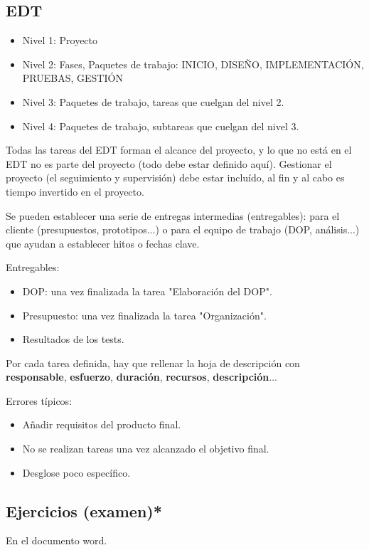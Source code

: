 \documentclass{article}
\begin{document}
\subsection{EDT}
\begin{itemize}
	\item Nivel 1: Proyecto
	\item Nivel 2: Fases, Paquetes de trabajo: INICIO, DISEÑO, IMPLEMENTACIÓN, PRUEBAS, GESTIÓN
	\item Nivel 3: Paquetes de trabajo, tareas que cuelgan del nivel 2.
	\item Nivel 4: Paquetes de trabajo, subtareas que cuelgan del nivel 3.
\end{itemize}
Todas las tareas del EDT forman el alcance del proyecto, y lo que no está en el EDT no es parte del proyecto (todo debe estar definido aquí). 
Gestionar el proyecto (el seguimiento y supervisión) debe estar incluído, al fin y al cabo es tiempo invertido en el proyecto. 

Se pueden establecer una serie de entregas intermedias (entregables): para el cliente (presupuestos, prototipos...) o para el equipo de trabajo (DOP, análisis...) que ayudan a establecer hitos o fechas clave. 

Entregables:
\begin{itemize}
	\item DOP: una vez finalizada la tarea "Elaboración del DOP".
	\item Presupuesto: una vez finalizada la tarea "Organización".
	\item Resultados de los tests.
\end{itemize}

Por cada tarea definida, hay que rellenar la hoja de descripción con \textbf{responsable}, \textbf{esfuerzo}, \textbf{duración}, \textbf{recursos}, \textbf{descripción}...

Errores típicos:
\begin{itemize}
	\item Añadir requisitos del producto final.
	\item No se realizan tareas una vez alcanzado el objetivo final.
	\item Desglose poco específico.
\end{itemize}

\subsection{Ejercicios (examen)*}
En el documento word.
\end{document}
